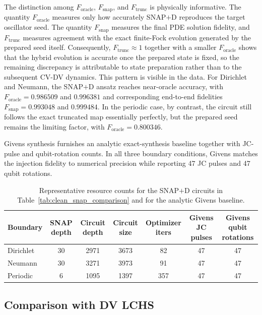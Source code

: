 The distinction among $F_{\mathrm{oracle}}$, $F_{\mathrm{snap}}$, and $F_{\mathrm{trunc}}$ is physically informative. The quantity $F_{\mathrm{oracle}}$ measures only how accurately SNAP$+$D reproduces the target oscillator seed. The quantity $F_{\mathrm{snap}}$ measures the final PDE solution fidelity, and $F_{\mathrm{trunc}}$ measures agreement with the exact finite-Fock evolution generated by the prepared seed itself. Consequently, $F_{\mathrm{trunc}}\approx 1$ together with a smaller $F_{\mathrm{oracle}}$ shows that the hybrid evolution is accurate once the prepared state is fixed, so the remaining discrepancy is attributable to state preparation rather than to the subsequent CV-DV dynamics. This pattern is visible in the data. For Dirichlet and Neumann, the SNAP$+$D ansatz reaches near-oracle accuracy, with $F_{\mathrm{oracle}}=0.986509$ and $0.996381$ and corresponding end-to-end fidelities $F_{\mathrm{snap}}=0.993048$ and $0.999484$. In the periodic case, by contrast, the circuit still follows the exact truncated map essentially perfectly, but the prepared seed remains the limiting factor, with $F_{\mathrm{oracle}}=0.800346$.

Givens synthesis furnishes an analytic exact-synthesis baseline together with JC-pulse and qubit-rotation counts. In all three boundary conditions, Givens matches the injection fidelity to numerical precision while reporting 47 JC pulses and 47 qubit rotations.

\begin{table}[t]
\centering
{\small
\caption{Representative resource counts for the SNAP$+$D circuits in Table~\ref{tab:clean_snap_comparison} and for the analytic Givens baseline.}
\label{tab:clean_resource_counts}
\begin{tabular}{lcccccc}
\toprule
Boundary & SNAP depth & Circuit depth & Circuit size & Optimizer iters & Givens JC pulses & Givens qubit rotations \\
\midrule
Dirichlet & 30 & 2971 & 3673 & 82 & 47 & 47 \\
Neumann & 30 & 3271 & 3973 & 91 & 47 & 47 \\
Periodic & 6 & 1095 & 1397 & 357 & 47 & 47 \\
\bottomrule
\end{tabular}}
\end{table}

\subsection{Comparison with DV LCHS}

